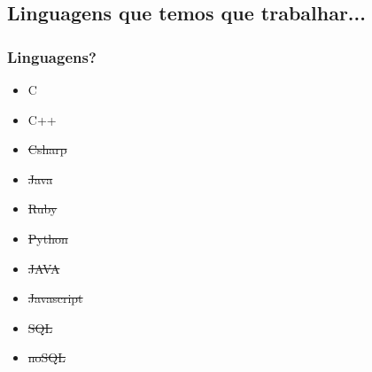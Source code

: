 \documentclass{beamer}
\begin{document}
\subsection{Linguagens que temos que trabalhar...}
\begin{frame} \frametitle{Linguagens?}
 \begin{itemize}
  \item C
  \item C++
  \item \st{Csharp}
  \item \st{Java}
  \item \st{Ruby}
  \item \st{Python}
  \item \st{JAVA}
  \item \st{Javascript}
  \item \st{SQL}
  \item \st{noSQL}
 \end{itemize}
\end{frame}
\end{document}
